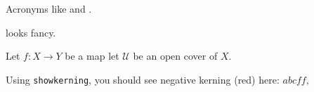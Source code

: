 \documentclass{scrartcl}
\begin{document}
Acronyms like  and .

 looks fancy.

Let $f\colon X\to Y$ be a map let $\mathcal{U}$ be an open cover of $X$.

Using \verb!showkerning!, you should see negative kerning (red) here: $abcff,$
\end{document}

